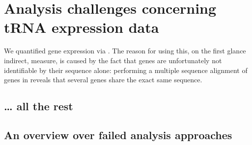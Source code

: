 \chapter{Analysis challenges concerning tRNA expression data}

We quantified \trna gene expression via  \chipseq. The reason for using this, on the first glance indirect, measure, is caused by the fact that \trna genes are unfortunately not identifiable by their sequence alone: performing a multiple sequence alignment of \trna genes in \mmu reveals that several \trna genes share the exact same sequence.

\section{… all the rest}

\section{An overview over failed analysis approaches}
